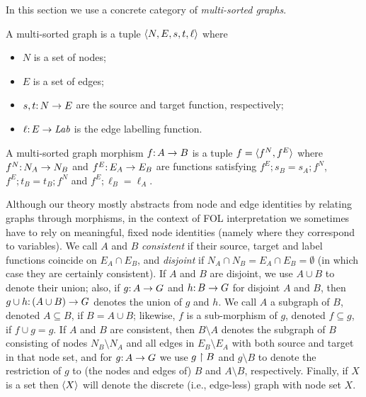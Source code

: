 In this section we use a concrete category of \emph{multi-sorted graphs}.
%
\begin{definition}
A multi-sorted graph is a tuple $\langle N,E,s,t,\ell\rangle$ where
\begin{itemize}
\item $N$ is a set of nodes;
\item $E$ is a set of edges;
\item $s,t{:}\, N\rightarrow E$ are the source and target function, respectively;
\item $\ell{:}\, E\rightarrow \mathit{Lab}$ is the edge labelling function.
\end{itemize}
A multi-sorted graph morphism $f{:}\, A\rightarrow B$ is a tuple $f=\langle f^N,f^E\rangle$ where $f^N{:}\, N_A\rightarrow N_B$ and $f^E{:}\, E_A\rightarrow E_B$ are functions satisfying $f^E;s_B=s_A;f^N$, $f^E;t_B=t_B;f^N$ and $f^E;\ell_B=\ell_A$.
\end{definition}
%
Although our theory mostly abstracts from node and edge identities by relating graphs through morphisms, in the context of FOL interpretation we sometimes have to rely on meaningful, fixed node identities (namely where they correspond to variables). We call $A$ and $B$ \emph{consistent} if their source, target and label functions coincide on $E_A\cap E_B$, and \emph{disjoint} if $N_A\cap N_B=E_A\cap E_B=\emptyset$ (in which case they are certainly consistent).  If $A$ and $B$ are disjoint, we use $A\cup B$ to denote their union; also, if $g{:}\, A\rightarrow G$ and $h{:}\, B\rightarrow G$ for disjoint $A$ and $B$, then $g\cup h{:}\, (A\cup B)\rightarrow G$ denotes the union of $g$ and $h$. We call $A$ a subgraph of $B$, denoted $A\subseteq B$, if $B=A\cup B$; likewise, $f$ is a sub-morphism of $g$, denoted $f\subseteq g$, if $f\cup g=g$. If $A$ and $B$ are consistent, then $B\setminus A$ denotes the subgraph of $B$ consisting of nodes $N_B\setminus N_A$ and all edges in $E_B\setminus E_A$ with both source and target in that node set, and for $g{:}\, A\rightarrow G$ we use $g\restriction B$ and $g\setminus B$ to denote the restriction of $g$ to (the nodes and edges of) $B$ and $A\setminus B$, respectively. Finally, if $X$ is a set then $\langle X\rangle$ will denote the discrete (i.e., edge-less) graph with node set $X$.

